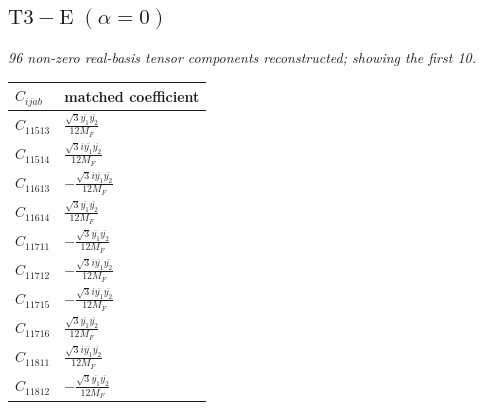 \documentclass[9pt]{article}
\begin{document}
\subsection*{$ \mathrm{T3-E}\;(\alpha=0) $}
\textit{96 non-zero real-basis tensor components reconstructed; showing the first 10.}
\begin{longtable}{@{}ll@{}}
\toprule
$C_{ijab}$ & matched coefficient \\
\midrule
$C_{11513}$ & $ \frac{\sqrt{3} \overline{y_{1}} \overline{y_{2}}}{12 M_F} $ \\
$C_{11514}$ & $ \frac{\sqrt{3} i \overline{y_{1}} \overline{y_{2}}}{12 M_F} $ \\
$C_{11613}$ & $ - \frac{\sqrt{3} i \overline{y_{1}} \overline{y_{2}}}{12 M_F} $ \\
$C_{11614}$ & $ \frac{\sqrt{3} \overline{y_{1}} \overline{y_{2}}}{12 M_F} $ \\
$C_{11711}$ & $ - \frac{\sqrt{3} \overline{y_{1}} \overline{y_{2}}}{12 M_F} $ \\
$C_{11712}$ & $ - \frac{\sqrt{3} i \overline{y_{1}} \overline{y_{2}}}{12 M_F} $ \\
$C_{11715}$ & $ - \frac{\sqrt{3} i \overline{y_{1}} \overline{y_{2}}}{12 M_F} $ \\
$C_{11716}$ & $ \frac{\sqrt{3} \overline{y_{1}} \overline{y_{2}}}{12 M_F} $ \\
$C_{11811}$ & $ \frac{\sqrt{3} i \overline{y_{1}} \overline{y_{2}}}{12 M_F} $ \\
$C_{11812}$ & $ - \frac{\sqrt{3} \overline{y_{1}} \overline{y_{2}}}{12 M_F} $ \\
\bottomrule
\end{longtable}
\end{document}
